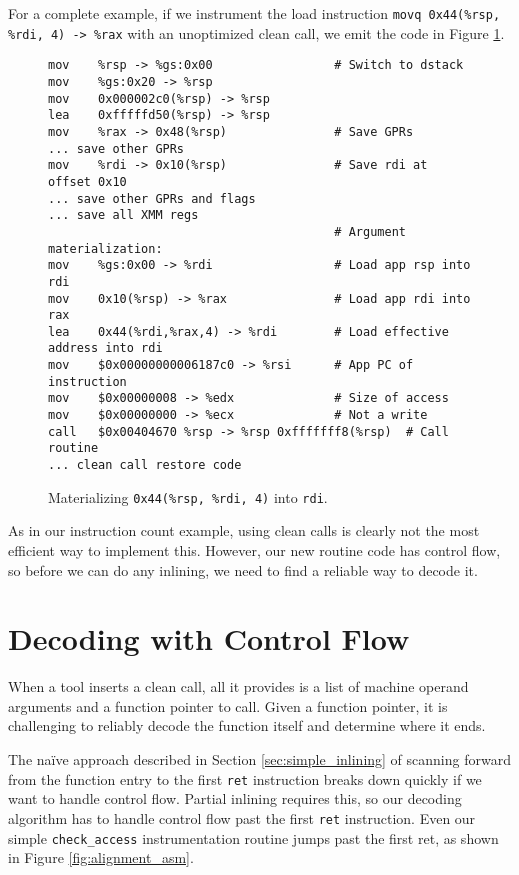 For a complete example, if we instrument the load instruction {\tt movq
0x44(\%rsp, \%rdi, 4) -> \%rax} with an unoptimized clean call, we emit the code
in Figure \ref{fig:arg_mat_lea}.

\begin{figure}
\begin{verbatim}
mov    %rsp -> %gs:0x00                 # Switch to dstack
mov    %gs:0x20 -> %rsp 
mov    0x000002c0(%rsp) -> %rsp 
lea    0xfffffd50(%rsp) -> %rsp 
mov    %rax -> 0x48(%rsp)               # Save GPRs
... save other GPRs
mov    %rdi -> 0x10(%rsp)               # Save rdi at offset 0x10
... save other GPRs and flags
... save all XMM regs
                                        # Argument materialization:
mov    %gs:0x00 -> %rdi                 # Load app rsp into rdi
mov    0x10(%rsp) -> %rax               # Load app rdi into rax
lea    0x44(%rdi,%rax,4) -> %rdi        # Load effective address into rdi
mov    $0x00000000006187c0 -> %rsi      # App PC of instruction
mov    $0x00000008 -> %edx              # Size of access
mov    $0x00000000 -> %ecx              # Not a write
call   $0x00404670 %rsp -> %rsp 0xfffffff8(%rsp)  # Call routine
... clean call restore code
\end{verbatim}
\caption{Materializing {\tt 0x44(\%rsp, \%rdi, 4)} into {\tt rdi}.}
\label{fig:arg_mat_lea}
\end{figure}

As in our instruction count example, using clean calls is clearly not the most
efficient way to implement this.  However, our new routine code has control
flow, so before we can do any inlining, we need to find a reliable way to decode
it.

\section{Decoding with Control Flow}
\label{sec:decoding_cti}

When a tool inserts a clean call, all it provides is a list of machine operand
arguments and a function pointer to call.  Given a function pointer, it is
challenging to reliably decode the function itself and determine where it ends.

The na\"ive approach described in Section \ref{sec:simple_inlining} of scanning
forward from the function entry to the first {\tt ret} instruction breaks down
quickly if we want to handle control flow.  Partial inlining requires this, so
our decoding algorithm has to handle control flow past the first {\tt ret}
instruction.  Even our simple {\tt check\_access} instrumentation routine
jumps past the first ret, as shown in Figure \ref{fig:alignment_asm}.

